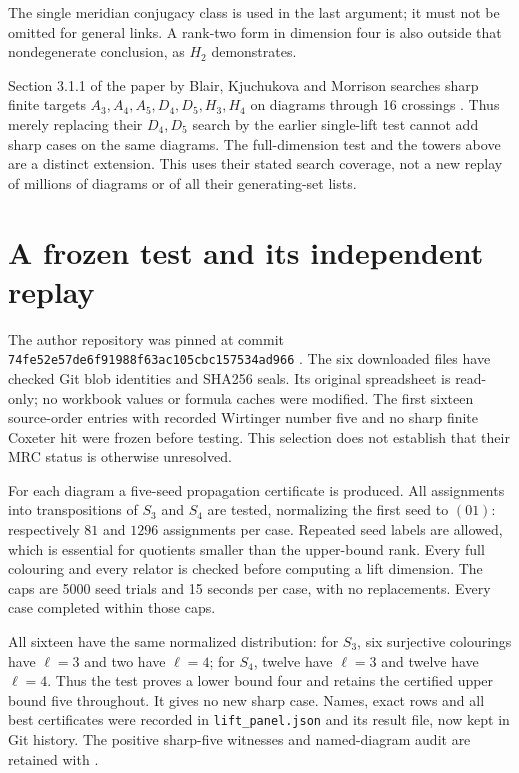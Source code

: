 \documentclass[11pt]{article}
\begin{document}
The single meridian conjugacy class is used in the last argument;
it must not be omitted for general links. A rank-two form in dimension
four is also outside that nondegenerate conclusion, as $H_2$ demonstrates.

Section 3.1.1 of the paper by Blair, Kjuchukova and Morrison searches
sharp finite targets
$A_3,A_4,A_5,D_4,D_5,H_3,H_4$ on diagrams through 16 crossings
\cite{bkm}. Thus merely replacing their $D_4,D_5$ search by the earlier
single-lift test cannot add sharp cases on the same diagrams.
The full-dimension test and the towers above are a distinct extension.
This uses their stated search coverage, not a new replay of millions
of diagrams or of all their generating-set lists.

\section{A frozen test and its independent replay}

The author repository was pinned at commit
\texttt{74fe52e57de6f91988f63ac105cbc157534ad966} \cite{code}.
The six downloaded files have checked Git blob identities and SHA256
seals. Its original spreadsheet is read-only; no workbook values or
formula caches were modified. The first sixteen source-order entries
with recorded Wirtinger number five and no sharp finite Coxeter hit
were frozen before testing. This selection does not establish that their
MRC status is otherwise unresolved.

For each diagram a five-seed propagation certificate is produced.
All assignments into transpositions of $S_3$ and $S_4$ are tested,
normalizing the first seed to $(01)$: respectively $81$ and $1296$
assignments per case. Repeated seed labels are allowed, which is
essential for quotients smaller than the upper-bound rank. Every full
colouring and every relator is checked before computing a lift dimension.
The caps are 5000 seed trials and 15 seconds per case, with no replacements.
Every case completed within those caps.

All sixteen have the same normalized distribution: for $S_3$, six
surjective colourings have $\ell=3$ and two have $\ell=4$; for $S_4$,
twelve have $\ell=3$ and twelve have $\ell=4$. Thus the test proves a
lower bound four and retains the certified upper bound five throughout.
It gives no new sharp case. Names, exact rows and all best certificates
were recorded in \texttt{lift\_panel.json} and its result file, now
kept in Git history. The positive sharp-five witnesses and named-diagram
audit are retained with .
\end{document}
